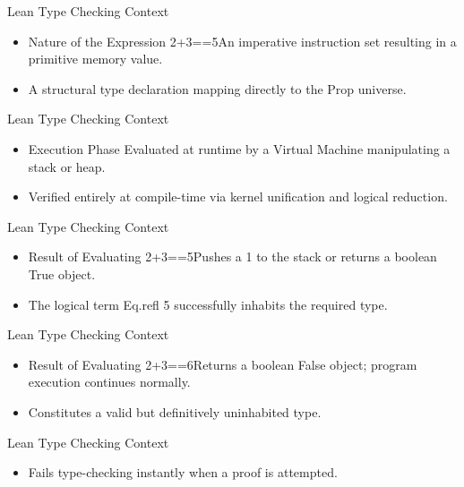 \documentclass[10pt]{beamer}
\begin{document}
\begin{frame}{Lean Type Checking Context}
\begin{itemize}\setlength{\itemsep}{1.5em}
  \item Nature of the Expression 2+3==5An imperative instruction set resulting in a primitive memory value.
  \item A structural type declaration mapping directly to the Prop universe.
\end{itemize}
\end{frame}

\begin{frame}{Lean Type Checking Context}
\begin{itemize}\setlength{\itemsep}{1.5em}
  \item Execution Phase Evaluated at runtime by a Virtual Machine manipulating a stack or heap.
  \item Verified entirely at compile-time via kernel unification and logical reduction.
\end{itemize}
\end{frame}

\begin{frame}{Lean Type Checking Context}
\begin{itemize}\setlength{\itemsep}{1.5em}
  \item Result of Evaluating 2+3==5Pushes a 1 to the stack or returns a boolean True object.
  \item The logical term Eq.refl 5 successfully inhabits the required type.
\end{itemize}
\end{frame}

\begin{frame}{Lean Type Checking Context}
\begin{itemize}\setlength{\itemsep}{1.5em}
  \item Result of Evaluating 2+3==6Returns a boolean False object; program execution continues normally.
  \item Constitutes a valid but definitively uninhabited type.
\end{itemize}
\end{frame}

\begin{frame}{Lean Type Checking Context}
\begin{itemize}\setlength{\itemsep}{1.5em}
  \item Fails type-checking instantly when a proof is attempted.
\end{itemize}
\end{frame}
\end{document}
